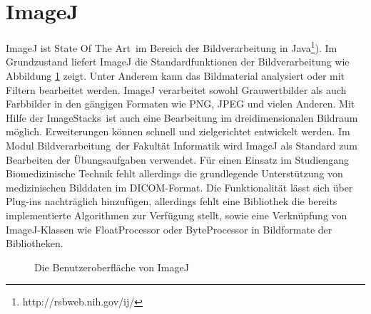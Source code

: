 \section{ImageJ}

ImageJ ist \glqq State Of The Art\grqq\ im Bereich der Bildverarbeitung in Java\footnote{http://rsbweb.nih.gov/ij/}). Im Grundzustand liefert ImageJ die Standardfunktionen der Bildverarbeitung wie Abbildung \ref{imagej} zeigt. Unter Anderem kann das Bildmaterial analysiert oder mit Filtern bearbeitet werden. ImageJ verarbeitet sowohl Grauwertbilder als auch Farbbilder in den gängigen Formaten wie PNG, JPEG und vielen Anderen. Mit Hilfe der \glqq ImageStacks\grqq\ ist auch eine Bearbeitung im dreidimensionalen Bildraum möglich. Erweiterungen können schnell und zielgerichtet entwickelt werden. Im Modul \glqq Bildverarbeitung\grqq\ der Fakultät Informatik wird ImageJ als Standard zum Bearbeiten der Übungsaufgaben verwendet. Für einen Einsatz im Studiengang Biomedizinische Technik fehlt allerdings die grundlegende Unterstützung von medizinischen Bilddaten im DICOM-Format. Die Funktionalität lässt sich über Plug-ins nachträglich hinzufügen, allerdings fehlt eine Bibliothek die bereits implementierte Algorithmen zur Verfügung stellt, sowie eine Verknüpfung von ImageJ-Klassen wie FloatProcessor oder ByteProcessor in Bildformate der Bibliotheken.

\begin{figure}[htbp]
  \vspace{0.5cm}
  \centering
  \caption{Die Benutzeroberfläche von ImageJ}
  \label{imagej}
  \vspace{0.5cm}
\end{figure}

